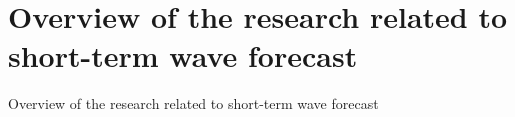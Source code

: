 \section{Overview of the research related to short-term wave forecast}
Overview of the research related to short-term wave forecast
